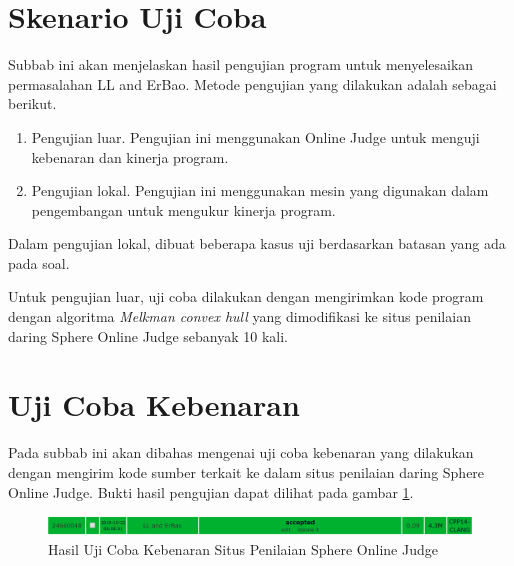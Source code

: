 \section{Skenario Uji Coba}
\label{sec:skenario-uji-coba}
Subbab ini akan menjelaskan hasil pengujian program untuk menyelesaikan permasalahan LL and ErBao. Metode pengujian yang dilakukan adalah sebagai berikut.
\begin{enumerate}
	\item Pengujian luar. Pengujian ini menggunakan Online Judge untuk menguji kebenaran dan kinerja program.
	\item Pengujian lokal. Pengujian ini menggunakan mesin yang digunakan dalam pengembangan untuk mengukur kinerja program.
\end{enumerate}
Dalam pengujian lokal, dibuat beberapa kasus uji berdasarkan batasan yang ada pada soal.
\par Untuk pengujian luar, uji coba dilakukan dengan mengirimkan kode program dengan algoritma \textit{Melkman convex hull} yang dimodifikasi ke situs penilaian daring Sphere Online Judge sebanyak 10 kali.

\section{Uji Coba Kebenaran}
Pada subbab ini akan dibahas mengenai uji coba kebenaran yang dilakukan dengan mengirim kode sumber terkait ke dalam situs penilaian daring Sphere Online Judge. Bukti hasil pengujian dapat dilihat pada gambar \ref{fig:hasil-uji-coba-kebenaran-situs-penilaian-spoj}.
\begin{figure}[!h]
	\Centering
	\includegraphics [width=\columnwidth]{bab5/img/hasil-uji-coba-kebenaran-situs-penilaian-spoj}
	\caption {Hasil Uji Coba Kebenaran Situs Penilaian Sphere Online Judge}
	\label {fig:hasil-uji-coba-kebenaran-situs-penilaian-spoj}
\end{figure}

